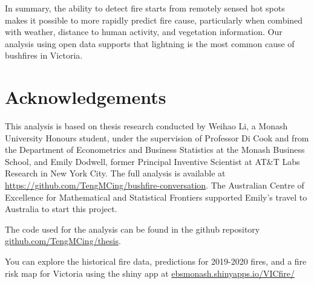 \documentclass[
  11pt,
  a4paper,
]{article}
\begin{document}
In summary, the ability to detect fire starts from remotely sensed hot spots makes it possible to more rapidly predict fire cause, particularly when combined with weather, distance to human activity, and vegetation information. Our analysis using open data supports that lightning is the most common cause of bushfires in Victoria.

\hypertarget{acknowledgements}{%
\section{Acknowledgements}\label{acknowledgements}}

This analysis is based on thesis research conducted by Weihao Li, a Monash University Honours student, under the supervision of Professor Di Cook and from the Department of Econometrics and Business Statistics at the Monash Business School, and Emily Dodwell, former Principal Inventive Scientist at AT\&T Labs Research in New York City. The full analysis is available at \url{https://github.com/TengMCing/bushfire-conversation}. The Australian Centre of Excellence for Mathematical and Statistical Frontiers supported Emily's travel to Australia to start this project.

The code used for the analysis can be found in the github repository \href{https://github.com/TengMCing/thesis}{github.com/TengMCing/thesis}.

You can explore the historical fire data, predictions for 2019-2020 fires, and a fire risk map for Victoria using the shiny app at \href{https://ebsmonash.shinyapps.io/VICfire/}{ebsmonash.shinyapps.io/VICfire/}

\printbibliography
\end{document}
